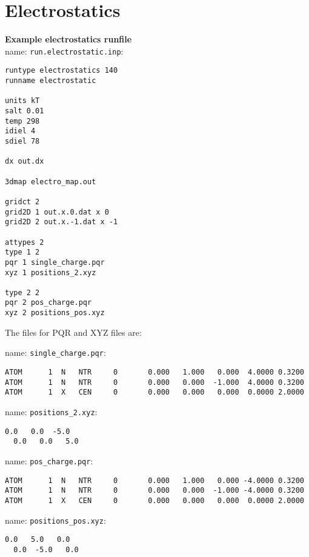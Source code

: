 \section{Electrostatics}

\textbf{Example electrostatics runfile} \\

name:  \texttt{run.electrostatic.inp}:
\begin{lstlisting}[style = MyBash]
runtype electrostatics 140
runname electrostatic

units kT
salt 0.01
temp 298
idiel 4 
sdiel 78

dx out.dx

3dmap electro_map.out

gridct 2
grid2D 1 out.x.0.dat x 0
grid2D 2 out.x.-1.dat x -1

attypes 2
type 1 2
pqr 1 single_charge.pqr
xyz 1 positions_2.xyz

type 2 2
pqr 2 pos_charge.pqr
xyz 2 positions_pos.xyz
\end{lstlisting}
\medskip

The files for PQR and XYZ files are: 

name:  \texttt{single\_charge.pqr}:
\begin{lstlisting}[style = MyBash]
ATOM      1  N   NTR     0       0.000   1.000   0.000  4.0000 0.3200
ATOM      1  N   NTR     0       0.000   0.000  -1.000  4.0000 0.3200
ATOM      1  X   CEN     0       0.000   0.000   0.000  0.0000 2.0000
\end{lstlisting}

\medskip

name:  \texttt{positions\_2.xyz}:
\begin{lstlisting}[style = MyBash]
  0.0   0.0  -5.0
  0.0   0.0   5.0
\end{lstlisting}
\medskip

name:  \texttt{pos\_charge.pqr}:
\begin{lstlisting}[style = MyBash]
ATOM      1  N   NTR     0       0.000   1.000   0.000 -4.0000 0.3200
ATOM      1  N   NTR     0       0.000   0.000  -1.000 -4.0000 0.3200
ATOM      1  X   CEN     0       0.000   0.000   0.000  0.0000 2.0000
\end{lstlisting}

\medskip

name:  \texttt{positions\_pos.xyz}:
\begin{lstlisting}[style = MyBash]
  0.0   5.0   0.0
  0.0  -5.0   0.0
\end{lstlisting}
\medskip

